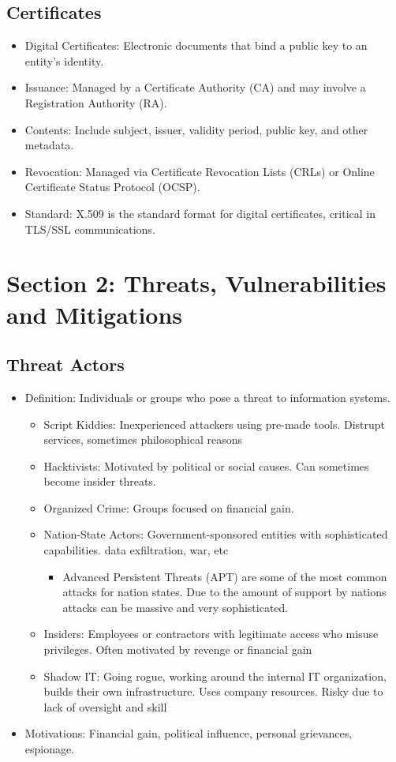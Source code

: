 \documentclass[11pt]{article}
\begin{document}
\subsection{Certificates}
\label{sec:orgc224d6d}
\begin{itemize}
\item Digital Certificates: Electronic documents that bind a public key to an entity’s identity.
\item Issuance: Managed by a Certificate Authority (CA) and may involve a Registration Authority (RA).
\item Contents: Include subject, issuer, validity period, public key, and other metadata.
\item Revocation: Managed via Certificate Revocation Lists (CRLs) or Online Certificate Status Protocol (OCSP).
\item Standard: X.509 is the standard format for digital certificates, critical in TLS/SSL communications.
\end{itemize}
\section{Section 2: Threats, Vulnerabilities and Mitigations}
\label{sec:orgcef2a5f}
\subsection{Threat Actors}
\label{sec:orgd4987c9}
\begin{itemize}
\item Definition: Individuals or groups who pose a threat to information systems.
\begin{itemize}
\item Script Kiddies: Inexperienced attackers using pre-made tools. Distrupt services, sometimes philosophical reasons
\item Hacktivists: Motivated by political or social causes. Can sometimes become insider threats.
\item Organized Crime: Groups focused on financial gain.
\item Nation-State Actors: Government-sponsored entities with sophisticated capabilities. data exfiltration, war, etc
\begin{itemize}
\item Advanced Persistent Threats (APT) are some of the most common attacks for nation states. Due to the amount of support by nations attacks can be massive and very sophisticated.
\end{itemize}
\item Insiders: Employees or contractors with legitimate access who misuse privileges. Often motivated by revenge or financial gain
\item Shadow IT: Going rogue, working around the internal IT organization, builds their own infrastructure. Uses company resources. Risky due to lack of oversight and skill
\end{itemize}
\item Motivations: Financial gain, political influence, personal grievances, espionage.
\end{itemize}
\end{document}

